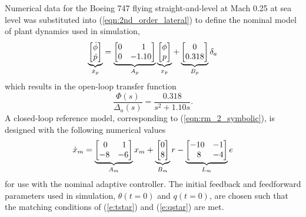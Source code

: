 Numerical data for the Boeing 747 flying straight-and-level at Mach 0.25 at sea level \cite{heffley1972aircraft} was substituted into (\ref{eqn:2nd_order_lateral}) to define the nominal model of plant dynamics used in simulation,
\begin{equation}
		\underbrace{\begin{bmatrix}
			\dot{\phi} \\ \dot{p}
		\end{bmatrix}}_{\dot{x}_p} = \underbrace{\begin{bmatrix}
			0 & \hfil 1 \\ 0 & -1.10
		\end{bmatrix}}_{A_p} \underbrace{\begin{bmatrix}
			\phi \\ p
		\end{bmatrix}}_{x_p} + \underbrace{\begin{bmatrix}
			0 \\ 0.318
		\end{bmatrix}}_{B_p} \delta_a \label{eqn:siso_plant_nominal_num}
\end{equation} \noindent which results in the open-loop transfer function 
\begin{equation}
		\frac{\Phi(s)}{\Delta_a(s)} = \frac{0.318}{s^2 + 1.10s}. 
\end{equation}
A closed-loop reference model, corresponding to (\ref{eqn:rm_2_symbolic}), is designed with the following numerical values
\begin{equation}
	\dot{x}_m = \underbrace{\begin{bmatrix}
		\hfil 0 & \hfil 1\\ -8 & -6
	\end{bmatrix}}_{A_m} x_m + \underbrace{\begin{bmatrix}
		0 \\ 8
	\end{bmatrix}}_{B_m} r - \underbrace{\begin{bmatrix}
		\hfil -10 & \hfil -1 \\ \hfil 8 & \hfil -4
	\end{bmatrix}}_{L_m} e
	\label{eqn:rm_2}
\end{equation}
\noindent for use with the nominal adaptive controller. The initial feedback and feedforward parameters used in simulation, $\theta(t=0)$ and $q(t=0)$, are chosen such that the matching conditions of (\ref{e:tstar}) and (\ref{e:qstar}) are met.

